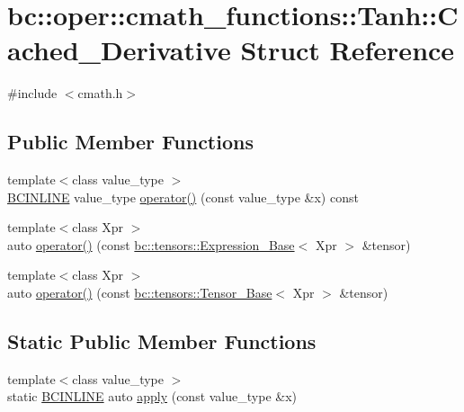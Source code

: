 \hypertarget{structbc_1_1oper_1_1cmath__functions_1_1Tanh_1_1Cached__Derivative}{}\section{bc\+:\+:oper\+:\+:cmath\+\_\+functions\+:\+:Tanh\+:\+:Cached\+\_\+\+Derivative Struct Reference}
\label{structbc_1_1oper_1_1cmath__functions_1_1Tanh_1_1Cached__Derivative}


{\ttfamily \#include $<$cmath.\+h$>$}

\subsection*{Public Member Functions}
\begin{DoxyCompactItemize}
\item 
{\footnotesize template$<$class value\+\_\+type $>$ }\\\hyperlink{common_8h_a6699e8b0449da5c0fafb878e59c1d4b1}{B\+C\+I\+N\+L\+I\+NE} value\+\_\+type \hyperlink{structbc_1_1oper_1_1cmath__functions_1_1Tanh_1_1Cached__Derivative_a5a22a30e73b5ba04e71ee01f60b8977e}{operator()} (const value\+\_\+type \&x) const
\item 
{\footnotesize template$<$class Xpr $>$ }\\auto \hyperlink{structbc_1_1oper_1_1cmath__functions_1_1Tanh_1_1Cached__Derivative_a901008fa7bc9e1ce64a2e6e79bf5eb7f}{operator()} (const \hyperlink{classbc_1_1tensors_1_1Expression__Base}{bc\+::tensors\+::\+Expression\+\_\+\+Base}$<$ Xpr $>$ \&tensor)
\item 
{\footnotesize template$<$class Xpr $>$ }\\auto \hyperlink{structbc_1_1oper_1_1cmath__functions_1_1Tanh_1_1Cached__Derivative_aafdc9c73f6b6d5a4cc85b3e3f35bfeea}{operator()} (const \hyperlink{classbc_1_1tensors_1_1Tensor__Base}{bc\+::tensors\+::\+Tensor\+\_\+\+Base}$<$ Xpr $>$ \&tensor)
\end{DoxyCompactItemize}
\subsection*{Static Public Member Functions}
\begin{DoxyCompactItemize}
\item 
{\footnotesize template$<$class value\+\_\+type $>$ }\\static \hyperlink{common_8h_a6699e8b0449da5c0fafb878e59c1d4b1}{B\+C\+I\+N\+L\+I\+NE} auto \hyperlink{structbc_1_1oper_1_1cmath__functions_1_1Tanh_1_1Cached__Derivative_a0d04dd0c1aee366e95a0c10c2d990a29}{apply} (const value\+\_\+type \&x)
\end{DoxyCompactItemize}


